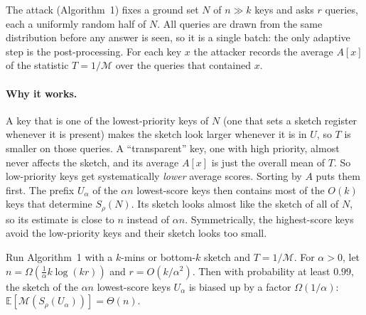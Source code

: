 \documentclass{cccg20}
\newcommand{\E}{\mathbb{E}}
\newcommand{\est}{\mathcal{M}}
\begin{document}
The attack (Algorithm~1) fixes a ground set $N$ of $n\gg k$ keys and asks $r$ queries, each a uniformly random half of $N$. All queries are drawn from the same distribution before any answer is seen, so it is a single batch: the only adaptive step is the post-processing. For each key $x$ the attacker records the average $A[x]$ of the statistic $T=1/\est$ over the queries that contained $x$.

\paragraph{Why it works.}
A key that is one of the lowest-priority keys of $N$ (one that sets a sketch register whenever it is present) makes the sketch look larger whenever it is in $U$, so $T$ is smaller on those queries. A ``transparent'' key, one with high priority, almost never affects the sketch, and its average $A[x]$ is just the overall mean of $T$. So low-priority keys get systematically \emph{lower} average scores. Sorting by $A$ puts them first. The prefix $U_\alpha$ of the $\alpha n$ lowest-score keys then contains most of the $O(k)$ keys that determine $S_\rho(N)$. Its sketch looks almost like the sketch of all of $N$, so its estimate is close to $n$ instead of $\alpha n$. Symmetrically, the highest-score keys avoid the low-priority keys and their sketch looks too small.

\begin{theorem}
Run Algorithm~1 with a $k$-mins or bottom-$k$ sketch and $T=1/\est$. For $\alpha>0$, let $n=\Omega(\frac{1}{\alpha}k\log(kr))$ and $r=O(k/\alpha^2)$. Then with probability at least $0.99$, the sketch of the $\alpha n$ lowest-score keys $U_\alpha$ is biased up by a factor $\Omega(1/\alpha)$: $\E[\est(S_\rho(U_\alpha))]=\Theta(n)$.
\end{theorem}
\end{document}
